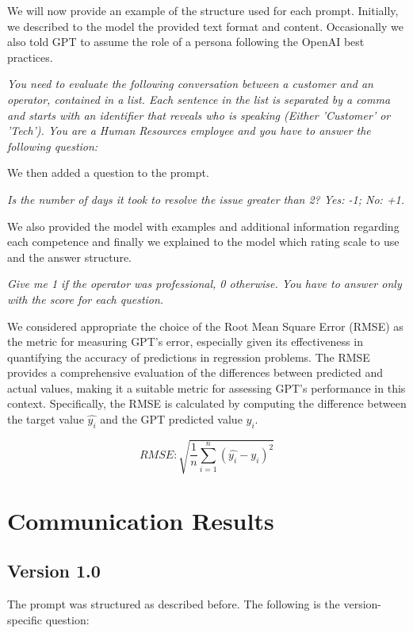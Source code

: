 We will now provide an example of the structure used for each prompt. Initially, we described to the model the provided text format and content. Occasionally we also told GPT to assume the role of a persona following the OpenAI best practices.
\begin{center}
      \textit{You need to evaluate the following conversation between a customer and an operator, contained in a list. Each sentence in the list is separated by a comma and starts with an identifier that reveals who is speaking (Either 'Customer' or 'Tech'). You are a Human Resources employee and you have to answer the following question:}
\end{center}
We then added a question to the prompt.
\begin{center}
      \textit{Is the number of days it took to resolve the issue greater than 2? Yes: -1; No: +1.}
\end{center}
We also provided the model with examples and additional information regarding each competence and finally we explained to the model which rating scale to use and the answer structure.
\begin{center}
      \textit{Give me 1 if the operator was professional, 0 otherwise. You have to answer only with the score for each question.}
\end{center}
We considered appropriate the choice of the Root Mean Square Error (RMSE) as the metric for measuring GPT's error, especially given its effectiveness in quantifying the accuracy of predictions in regression problems. The RMSE provides a comprehensive evaluation of the differences between predicted and actual values, making it a suitable metric for assessing GPT's performance in this context. Specifically, the RMSE is calculated by computing the difference between the target value \(\hat{y_i}\) and the GPT predicted value \(y_i\).
\begin{center}
      \[ RMSE: \sqrt{ \frac{1}{n}\sum_{i=1}^n (\hat{y_i} - y_i)^2}\]
\end{center}

\section{Communication Results}

\subsection{Version 1.0}
The prompt was structured as described before. The following is the version-specific question:\\

